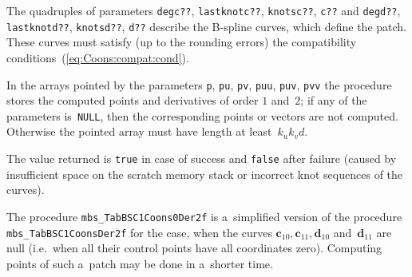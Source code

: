 \begin{sloppypar}
The quadruples of parameters \texttt{degc??}, \texttt{lastknotc??}, \texttt{knotsc??},
\texttt{c??} and \texttt{degd??}, \texttt{lastknotd??}, \texttt{knotsd??},
\texttt{d??} describe the B-spline curves, which define the patch.
These curves must satisfy (up to the rounding errors)
the compatibility conditions~(\ref{eq:Coons:compat:cond}).%
\end{sloppypar}

In the arrays pointed by the parameters \texttt{p}, \texttt{pu}, \texttt{pv},
\texttt{puu}, \texttt{puv}, \texttt{pvv} the procedure stores the computed
points and derivatives of order $1$ and~$2$; if any of the parameters
is~\texttt{NULL}, then the corresponding points or vectors are not computed.
Otherwise the pointed array must have length at least~$k_uk_vd$.

The value returned is \texttt{true} in case of success and \texttt{false}
after failure (caused by insufficient space on the scratch memory stack
or incorrect knot sequences of the curves).


\vspace{\bigskipamount}
\begin{sloppypar}
The procedure \texttt{mbs\_TabBSC1Coons0Der2f} is a~simplified version
of the procedure \texttt{mbs\_TabBSC1CoonsDer2f} for the case,
when the curves $\bm{c}_{10},\bm{c}_{11},\bm{d}_{10}$ and~$\bm{d}_{11}$ are
null (i.e.\ when all their control points have all coordinates zero).
Computing points of such a~patch may be done in a~shorter time.%
\end{sloppypar}

